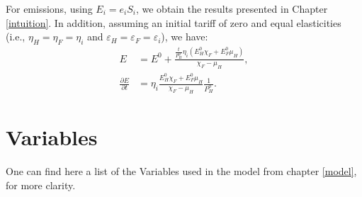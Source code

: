 For emissions, using $E_i = e_i S_i$, we obtain the results presented in Chapter \ref{intuition}. In addition, assuming an initial tariff of zero and equal elasticities (i.e., $\eta_H = \eta_F = \eta_i$ and $\varepsilon_H = \varepsilon_F = \varepsilon_i$), we have:
\begin{align*}
    E                             & = E^0 + \frac{\frac{t}{P_H^0} \eta_i (E_H^0 \chi_F + E_F^0 \mu_H)}{\chi_F - \mu_H}, \\[1mm]
    \frac{\partial E}{\partial t} & = \eta_i \frac{E_H^0 \chi_F + E_F^0 \mu_H}{\chi_F - \mu_H}\frac{1}{P_H^0}.
\end{align*}

\section{Variables}\label{appendix:Variables}

One can find here a list of the Variables used in the model from chapter \ref{model}, for more clarity.

